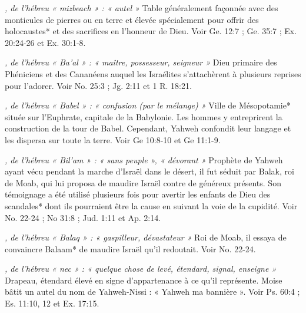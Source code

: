 \begin{multicols}{2}
{\textit{, de l'hébreu « mizbeach » : « autel »}\newline
Table généralement façonnée avec des monticules de pierres ou en terre et élevée spécialement pour offrir des holocaustes* et des sacrifices en l'honneur de Dieu. Voir Ge. 12:7 ; Ge. 35:7 ; Ex. 20:24-26 et Ex. 30:1-8.

\textit{, de l'hébreu « Ba'al » : « maître, possesseur, seigneur »}\newline
Dieu primaire des Phéniciens et des Cananéens auquel les Israélites s'attachèrent à plusieurs reprises pour l'adorer. Voir No. 25:3 ; Jg. 2:11 et 1 R. 18:21.

\textit{, de l'hébreu « Babel » : « confusion (par le mélange) »}\newline
Ville de Mésopotamie* située sur l'Euphrate, capitale de la Babylonie. Les hommes y entreprirent la construction de la tour de Babel. Cependant, Yahweh confondit leur langage et les dispersa sur toute la terre. Voir Ge 10:8-10 et Ge 11:1-9.

\textit{, de l'hébreu « Bil'am » : « sans peuple », « dévorant »}\newline
Prophète de Yahweh ayant vécu pendant la marche d'Israël dans le désert, il fut séduit par Balak, roi de Moab, qui lui proposa de maudire Israël contre de généreux présents. Son témoignage a été utilisé plusieurs fois pour avertir les enfants de Dieu des scandales* dont ils pourraient être la cause en suivant la voie de la cupidité. Voir No. 22-24 ; No 31:8 ; Jud. 1:11 et Ap. 2:14.

\textit{, de l'hébreu « Balaq » : « gaspilleur, dévastateur »}\newline
Roi de Moab, il essaya de convaincre Balaam* de maudire Israël qu'il redoutait. Voir No. 22-24.

\textit{, de l'hébreu « nec » : « quelque chose de levé, étendard, signal, enseigne »}\newline
Drapeau, étendard élevé en signe d'appartenance à ce qu'il représente. Moise bâtit un autel du nom de Yahweh-Nissi : « Yahweh ma bannière ». Voir Ps. 60:4 ; Es. 11:10, 12 et Ex. 17:15.

}
\end{multicols}
